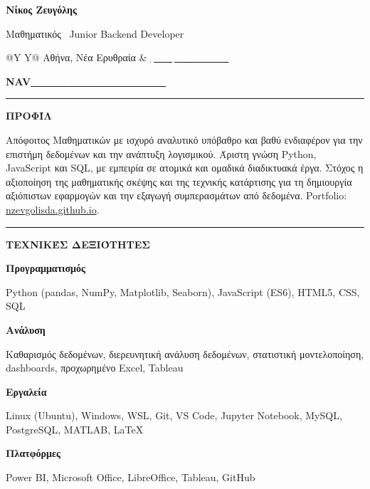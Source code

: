 \documentclass[10pt,a4paper]{article}
\newcommand{\sectiontitle}[1]{%
    \vspace{0.28em}%
    {\color{accent}\rule{0.08\textwidth}{1.4pt}}\hspace{0.55em}%
    {\small\bfseries\color{ink}\MakeUppercase{#1}}\par
    \vspace{0.12em}
}
\newcommand{\cvrow}[2]{%
    {\small\bfseries\color{accent}#1}\par
    {\small\color{ink}#2}\par\vspace{0.03em}
}
\begin{document}
\noindent\colorbox{ink}{%
    \parbox{\dimexpr\textwidth-2\fboxsep\relax}{%
        \vspace{0.15em}
        {\fontsize{27}{30}\selectfont\bfseries\color{white}Νίκος Ζευγόλης}\par
        \vspace{2pt}
        {\large\color{accent}Μαθηματικός \textbar\ Junior Backend Developer}\par
        \vspace{7pt}
        \begin{tabularx}{\linewidth}{@{}Y Y@{}}
            {\footnotesize\color{white}\faMapMarker\hspace{0.35em}Αθήνα, Νέα Ερυθραία} &
            {\footnotesize\color{white}\href{tel:+306942571752}{\textcolor{white}{\faPhone\hspace{0.35em}(+30) 6942571752}}}\\
        \end{tabularx}\par\vspace{3pt}
        \parbox{\linewidth}{\footnotesize\color{white}\textbf{NAV}\hspace{0.8em}\href{https://nzevgolisda.github.io/}{\textcolor{white}{Portfolio}}\hspace{1.1em}\href{https://github.com/nzevgolisda}{\textcolor{white}{GitHub}}\hspace{1.1em}\href{https://www.linkedin.com/in/nikos-zevgolis-2193871b7/}{\textcolor{white}{LinkedIn}}\hspace{1.1em}\href{mailto:nzevgolisda@gmail.com}{\textcolor{white}{Email}}}
        \vspace{0.45em}
    }%
}\par

\sectiontitle{Προφίλ}
Απόφοιτος Μαθηματικών με ισχυρό αναλυτικό υπόβαθρο και βαθύ ενδιαφέρον για την επιστήμη δεδομένων και την ανάπτυξη λογισμικού. Άριστη γνώση Python, JavaScript και SQL, με εμπειρία σε ατομικά και ομαδικά διαδικτυακά έργα. Στόχος η αξιοποίηση της μαθηματικής σκέψης και της τεχνικής κατάρτισης για τη δημιουργία αξιόπιστων εφαρμογών και την εξαγωγή συμπερασμάτων από δεδομένα. Portfolio: \href{https://nzevgolisda.github.io/}{nzevgolisda.github.io}.

\sectiontitle{Τεχνικές Δεξιότητες}
\cvrow{Προγραμματισμός}{Python (pandas, NumPy, Matplotlib, Seaborn), JavaScript (ES6), HTML5, CSS, SQL}
\cvrow{Ανάλυση}{Καθαρισμός δεδομένων, διερευνητική ανάλυση δεδομένων, στατιστική μοντελοποίηση, dashboards, προχωρημένο Excel, Tableau}
\cvrow{Εργαλεία}{Linux (Ubuntu), Windows, WSL, Git, VS Code, Jupyter Notebook, MySQL, PostgreSQL, MATLAB, \LaTeX}
\cvrow{Πλατφόρμες}{Power BI, Microsoft Office, LibreOffice, Tableau, GitHub}
\end{document}
